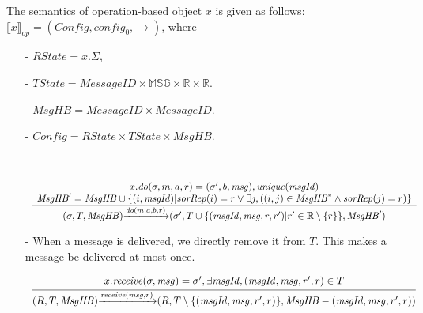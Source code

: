 The semantics of operation-based object $x$ is given as follows: $\llbracket x \rrbracket_{\mathit{op}} = (\mathit{Config},\mathit{config}_0,\rightarrow)$, where

\begin{itemize}
\setlength{\itemsep}{0.5pt}
\item[-] $\mathit{RState} = x.\Sigma$,

\item[-] $\mathit{TState} = \mathit{MessageID} \times \mathbb{MSG} \times \mathbb{R} \times \mathbb{R}$. 

\item[-] $\mathit{MsgHB} = \mathit{MessageID} \times \mathit{MessageID}$.

\item[-] $\mathit{Config} = \mathit{RState} \times \mathit{TState} \times \mathit{MsgHB}$. 

\item[-] 

$\begin{array}{l c}
   \bigfrac{
   \begin{array}{c}
     x.\mathit{do}(\sigma,m,a,r) = (\sigma',b,\mathit{msg}), \mathit{unique}(\mathit{msgId})\\
     \mathit{MsgHB}' = \mathit{MsgHB} \cup \{ (i,\mathit{msgId}) \vert \mathit{sorRep}(i) = r \vee \exists j, ( (i,j) \in \mathit{MsgHB}^* \wedge \mathit{sorRep}(j) = r) \}
   \end{array}}
     {(\sigma,T,\mathit{MsgHB}) {\xrightarrow{\mathit{do}(m,a,b,r)}} (\sigma',T \cup \{ (\mathit{msgId},\mathit{msg},r,r') \vert r' \in \mathbb{R} \setminus \{ r \} \},\mathit{MsgHB}')}
\end{array}$

\item[-] When a message is delivered, we directly remove it from $T$. This makes a message be delivered at most once. 

$\begin{array}{l c}
   \bigfrac{
   \begin{array}{c}
      x.\mathit{receive}(\sigma,\mathit{msg}) = \sigma',\exists \mathit{msgId},(\mathit{msgId},\mathit{msg},r',r) \in T
   \end{array}}
     {(R,T,\mathit{MsgHB}) {\xrightarrow{\mathit{receive}(\mathit{msg},r)}} (R,T \setminus \{ (\mathit{msgId},\mathit{msg},r',r) \},\mathit{MsgHB} - (\mathit{msgId},\mathit{msg},r',r) )}
\end{array}$
\end{itemize}


